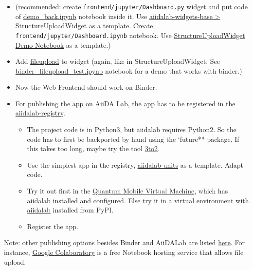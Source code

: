 \begin{itemize}
\tightlist
\item
  (recommended: create \texttt{frontend/jupyter/Dashboard.py} widget and
  put code of
  \href{./frontend/jupyter/demo/demo_backend.ipynb}{demo\_back.ipynb}
  notebook inside it. Use
  \href{https://github.com/aiidalab/aiidalab-widgets-base/blob/master/aiidalab_widgets_base/structures.py}{aiidalab-widgets-base
  \textgreater{} StructureUploadWidget} as a template. Create
  \texttt{frontend/jupyter/Dashboard.ipynb} notebook. Use
  \href{https://github.com/aiidalab/aiidalab-widgets-base/blob/master/structures.ipynb}{StructureUploadWidget
  Demo Notebook} as a template.)
\item
  Add \href{https://pypi.org/project/fileupload/}{fileupload} to widget
  (again, like in StructureUploadWidget. See
  \href{./frontend/jupyter/demo/binder_fileupload_test.ipynb}{binder\_fileupload\_test.ipynb}
  notebook for a demo that works with binder.)
\item
  Now the Web Frontend should work on Binder.
\item
  For publishing the app on AiiDA Lab, the app has to be registered in
  the
  \href{https://github.com/aiidalab/aiidalab-registry}{aiidalab-registry}.

  \begin{itemize}
  \tightlist
  \item
    The project code is in Python3, but aiidalab requires Python2. So
    the code has to first be backported by hand using the `future**
    package. If this takes too long, maybe try the tool
    \href{https://pypi.org/project/3to2/}{3to2}.
  \item
    Use the simplest app in the registry,
    \href{https://github.com/aiidalab/aiidalab-units}{aiidalab-units} as
    a template. Adapt code.
  \item
    Try it out first in the
    \href{https://www.materialscloud.org/work/quantum-mobile}{Quantum
    Mobile Virtual Machine}, which has aiidalab installed and
    configured. Else try it in a virtual environment with
    \href{https://pypi.org/project/aiidalab/}{aiidalab} installed from
    PyPI.
  \item
    Register the app.
  \end{itemize}
\end{itemize}

Note: other publishing options besides Binder and AiiDALab are listed
\href{https://github.com/markusschanta/awesome-jupyter}{here}. For
instance, \href{http://colab.research.google.com/}{Google Colaboratory}
is a free Notebook hosting service that allows file upload.

